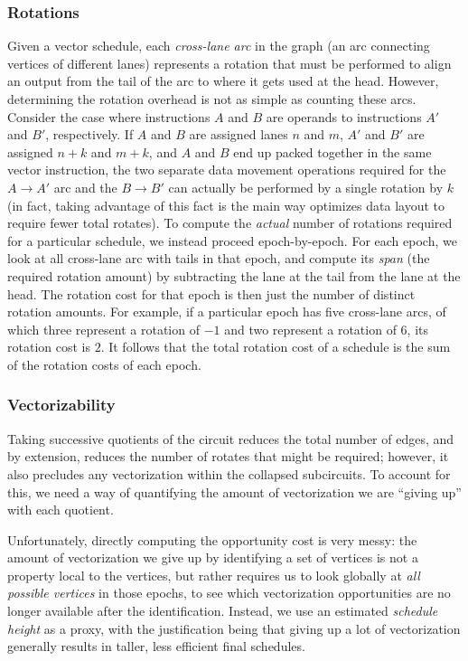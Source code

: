 \subsubsection*{Rotations}
Given a vector schedule, each {\em cross-lane arc} in the graph (an arc connecting vertices of different lanes) represents a rotation that must be performed to align an output from the tail of the arc to where it gets used at the head.
However, determining the rotation overhead is not as simple as counting these arcs.
Consider the case where instructions $A$ and $B$ are operands to instructions $A'$ and $B'$, respectively.
If $A$ and $B$ are assigned lanes $n$ and $m$, $A'$ and $B'$ are assigned $n+k$ and $m+k$, and $A$ and $B$ end up packed together in the same vector instruction, the two separate data movement operations required for the $A\to A'$ arc and the $B\to B'$ can actually be performed by a single rotation by $k$ (in fact, taking advantage of this fact is the main way \system optimizes data layout to require fewer total rotates). 
To compute the {\em actual} number of rotations required for a particular schedule, we instead proceed epoch-by-epoch. 
For each epoch, we look at all cross-lane arc with tails in that epoch, and compute its {\em span} (the required rotation amount) by subtracting the lane at the tail from the lane at the head.
The rotation cost for that epoch is then just the number of distinct rotation amounts.
For example, if a particular epoch has five cross-lane arcs, of which three represent a rotation of $-1$ and two represent a rotation of $6$, its rotation cost is $2$.
It follows that the total rotation cost of a schedule is the sum of the rotation costs of each epoch.

\subsubsection*{Vectorizability}
Taking successive quotients of the circuit reduces the total number of edges, and by extension, reduces the number of rotates that might be required; however, it also precludes any vectorization within the collapsed subcircuits.
To account for this, we need a way of quantifying the amount of vectorization we are ``giving up'' with each quotient.

Unfortunately, directly computing the opportunity cost is very messy: the amount of vectorization we give up by identifying a set of vertices is not a property local to the vertices, but rather requires us to look globally at {\em all possible vertices} in those epochs, to see which vectorization opportunities are no longer available after the identification.
Instead, we use an estimated {\em schedule height} as a proxy, with the justification being that giving up a lot of vectorization generally results in taller, less efficient final schedules. 

